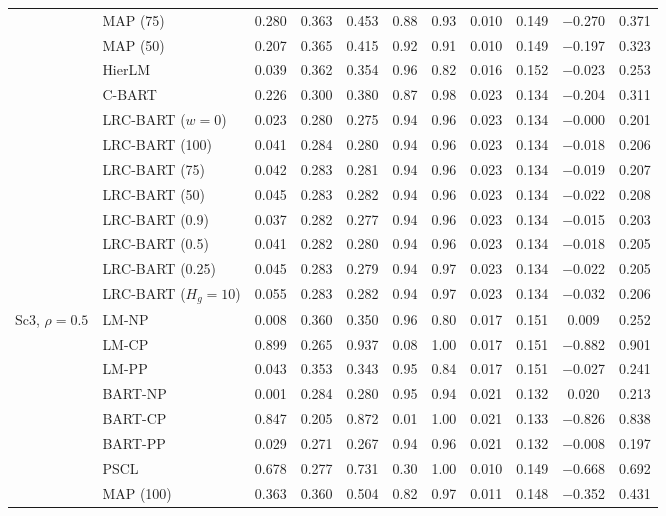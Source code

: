 \begin{center}
\begin{longtable}{llccccccccc}
& MAP (75) & 0.280 & 0.363 & 0.453 & 0.88 & 0.93 & 0.010 & 0.149 & $-$0.270 & 0.371 \\
& MAP (50) & 0.207 & 0.365 & 0.415 & 0.92 & 0.91 & 0.010 & 0.149 & $-$0.197 & 0.323 \\
& HierLM & 0.039 & 0.362 & 0.354 & 0.96 & 0.82 & 0.016 & 0.152 & $-$0.023 & 0.253 \\
& C-BART & 0.226 & 0.300 & 0.380 & 0.87 & 0.98 & 0.023 & 0.134 & $-$0.204 & 0.311 \\
& LRC-BART ($w=0$) & 0.023 & 0.280 & 0.275 & 0.94 & 0.96 & 0.023 & 0.134 & $-$0.000 & 0.201 \\
& LRC-BART (100) & 0.041 & 0.284 & 0.280 & 0.94 & 0.96 & 0.023 & 0.134 & $-$0.018 & 0.206 \\
& LRC-BART (75) & 0.042 & 0.283 & 0.281 & 0.94 & 0.96 & 0.023 & 0.134 & $-$0.019 & 0.207 \\
& LRC-BART (50) & 0.045 & 0.283 & 0.282 & 0.94 & 0.96 & 0.023 & 0.134 & $-$0.022 & 0.208 \\
& LRC-BART (0.9) & 0.037 & 0.282 & 0.277 & 0.94 & 0.96 & 0.023 & 0.134 & $-$0.015 & 0.203 \\
& LRC-BART (0.5) & 0.041 & 0.282 & 0.280 & 0.94 & 0.96 & 0.023 & 0.134 & $-$0.018 & 0.205 \\
& LRC-BART (0.25) & 0.045 & 0.283 & 0.279 & 0.94 & 0.97 & 0.023 & 0.134 & $-$0.022 & 0.205 \\
& LRC-BART ($H_g=10$) & 0.055 & 0.283 & 0.282 & 0.94 & 0.97 & 0.023 & 0.134 & $-$0.032 & 0.206 \\
\midrule
\multirow{20}{*}{Sc3, $\rho=0.5$} & LM-NP & 0.008 & 0.360 & 0.350 & 0.96 & 0.80 & 0.017 & 0.151 & 0.009 & 0.252 \\
& LM-CP & 0.899 & 0.265 & 0.937 & 0.08 & 1.00 & 0.017 & 0.151 & $-$0.882 & 0.901 \\
& LM-PP & 0.043 & 0.353 & 0.343 & 0.95 & 0.84 & 0.017 & 0.151 & $-$0.027 & 0.241 \\
& BART-NP & 0.001 & 0.284 & 0.280 & 0.95 & 0.94 & 0.021 & 0.132 & 0.020 & 0.213 \\
& BART-CP & 0.847 & 0.205 & 0.872 & 0.01 & 1.00 & 0.021 & 0.133 & $-$0.826 & 0.838 \\
& BART-PP & 0.029 & 0.271 & 0.267 & 0.94 & 0.96 & 0.021 & 0.132 & $-$0.008 & 0.197 \\
& PSCL & 0.678 & 0.277 & 0.731 & 0.30 & 1.00 & 0.010 & 0.149 & $-$0.668 & 0.692 \\
& MAP (100) & 0.363 & 0.360 & 0.504 & 0.82 & 0.97 & 0.011 & 0.148 & $-$0.352 & 0.431 \\

\end{longtable}
\end{center}

